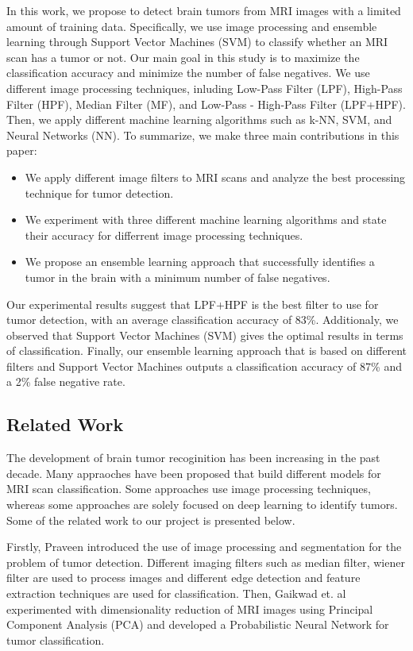 \documentclass[conference]{IEEEtran}
\begin{document}
In this work, we propose to detect brain tumors from MRI images with a limited amount of training data. Specifically, we use image processing and ensemble learning through Support Vector Machines (SVM) to classify whether an MRI scan has a tumor or not. Our main goal in this study is to maximize the classification accuracy and minimize the number of false negatives. We use different image processing techniques, inluding Low-Pass Filter (LPF), High-Pass Filter (HPF), Median Filter (MF), and Low-Pass - High-Pass Filter (LPF+HPF). Then, we apply different machine learning algorithms such as k-NN, SVM, and Neural Networks (NN). To summarize, we make three main contributions in this paper:
\begin{itemize}
  \item We apply different image filters to MRI scans and analyze the best processing technique for tumor detection.
  \item We experiment with three different machine learning algorithms and state their accuracy for differrent image processing techniques.
  \item We propose an ensemble learning approach that successfully identifies a tumor in the brain with a minimum number of false negatives. 
\end{itemize}
Our experimental results suggest that LPF+HPF is the best filter to use for tumor detection, with an average classification accuracy of 83\%. Additionaly, we observed that Support Vector Machines (SVM) gives the optimal results in terms of classification. Finally, our ensemble learning approach that is based on different filters and Support Vector Machines outputs a classification accuracy of 87\% and a 2\% false negative rate. 

\subsection{Related Work} 
The development of brain tumor recoginition has been increasing in the past decade. Many appraoches have been proposed that build different models for MRI scan classification. Some approaches use image processing techniques, whereas some approaches are solely focused on deep learning to identify tumors. Some of the related work to our project is presented below. 

Firstly, Praveen \cite{b3} introduced the use of image processing and segmentation for the problem of tumor detection. Different imaging filters such as median filter, wiener filter are used to process images and different edge detection and feature extraction techniques are used for classification. Then, Gaikwad et. al \cite{b4} experimented with dimensionality reduction of MRI images using Principal Component Analysis (PCA) and developed a Probabilistic Neural Network for tumor classification. 
\end{document}
